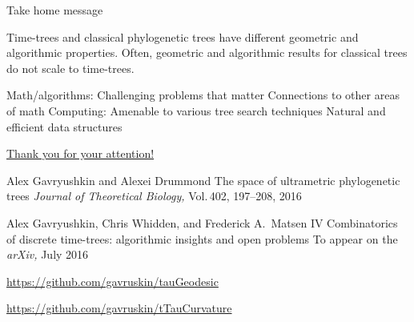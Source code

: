 \documentclass{beamer}
\theoremstyle{example}
\begin{document}
\begin{frame}{Take home message}

\begin{block}{}
\begin{outline}
\1 Time-trees and classical phylogenetic trees have different geometric and algorithmic properties.
\1 Often, geometric and algorithmic results for classical trees do not scale to time-trees.
\end{outline}
\end{block}

\pause

\begin{block}{}
\begin{outline}
\1 Math/algorithms:
	\2 Challenging problems that matter
	\2 Connections to other areas of math
\1 Computing:
	\2 Amenable to various tree search techniques
	\2 Natural and efficient data structures
\end{outline}
\end{block}
\end{frame}

\begin{frame}{\href{http://alex.gavruskin.com/pictures/}{\Large{Thank you for your attention!}}}


\scriptsize

Alex Gavryushkin and Alexei Drummond
\newblock The space of ultrametric phylogenetic trees
\newblock \emph{Journal of Theoretical Biology,} Vol.\,402, 197--208, 2016

Alex Gavryushkin, Chris Whidden, and Frederick A.\ Matsen IV
\newblock Combinatorics of discrete time-trees: algorithmic insights and open problems
\newblock To appear on the {\em arXiv,} July 2016

\url{https://github.com/gavruskin/tauGeodesic}

\url{https://github.com/gavruskin/tTauCurvature}
\end{frame}
\end{document}
